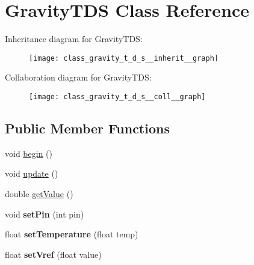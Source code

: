\hypertarget{class_gravity_t_d_s}{}\section{Gravity\+T\+DS Class Reference}
\label{class_gravity_t_d_s}


Inheritance diagram for Gravity\+T\+DS\+:\nopagebreak
\begin{figure}[H]
\begin{center}
\leavevmode
\texttt{[image: class\_gravity\_t\_d\_s\_\_inherit\_\_graph]}
\end{center}
\end{figure}


Collaboration diagram for Gravity\+T\+DS\+:\nopagebreak
\begin{figure}[H]
\begin{center}
\leavevmode
\texttt{[image: class\_gravity\_t\_d\_s\_\_coll\_\_graph]}
\end{center}
\end{figure}
\subsection*{Public Member Functions}
\begin{DoxyCompactItemize}
\item 
void \hyperlink{class_gravity_t_d_s_a1918273706ab9bfafe2e9a3ea3a61171}{begin} ()
\item 
void \hyperlink{class_gravity_t_d_s_a56be401a2aa89a4918319e0d8262ea48}{update} ()
\item 
double \hyperlink{class_gravity_t_d_s_a9812b355ecc031f1dfb7039208f1c170}{get\+Value} ()
\item 
void {\bfseries set\+Pin} (int pin)\hypertarget{class_gravity_t_d_s_a9a91e8461f6696ffff169c456eb9cbac}{}\label{class_gravity_t_d_s_a9a91e8461f6696ffff169c456eb9cbac}

\item 
float {\bfseries set\+Temperature} (float temp)\hypertarget{class_gravity_t_d_s_a000fe439b71ff425ddbb27d5bfd480a9}{}\label{class_gravity_t_d_s_a000fe439b71ff425ddbb27d5bfd480a9}

\item 
float {\bfseries set\+Vref} (float value)\hypertarget{class_gravity_t_d_s_ab7732b7a1ac0c4725b48d9c601830176}{}\label{class_gravity_t_d_s_ab7732b7a1ac0c4725b48d9c601830176}

\end{DoxyCompactItemize}


